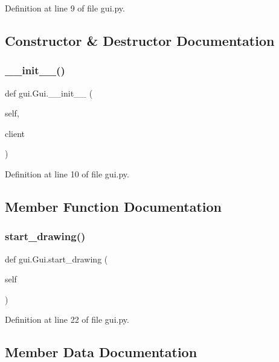 Definition at line 9 of file gui.\+py.



\subsection{Constructor \& Destructor Documentation}
\mbox{\label{classgui_1_1_gui_a78f4c12804c4f7043db8018eb343e342}} 
\subsubsection{\texorpdfstring{\_\_init\_\_()}{\_\_init\_\_()}}
{\footnotesize\ttfamily def gui.\+Gui.\+\_\+\+\_\+init\+\_\+\+\_\+ (\begin{DoxyParamCaption}\item[{}]{self,  }\item[{}]{client }\end{DoxyParamCaption})}



Definition at line 10 of file gui.\+py.



\subsection{Member Function Documentation}
\mbox{\label{classgui_1_1_gui_a629cf0014276095158a43b1bc18ef201}} 
\subsubsection{\texorpdfstring{start\_drawing()}{start\_drawing()}}
{\footnotesize\ttfamily def gui.\+Gui.\+start\+\_\+drawing (\begin{DoxyParamCaption}\item[{}]{self }\end{DoxyParamCaption})}



Definition at line 22 of file gui.\+py.



\subsection{Member Data Documentation}
\mbox{\label{classgui_1_1_gui_af3570ee6e42bbdfb0463e7376389bbb2}} 
